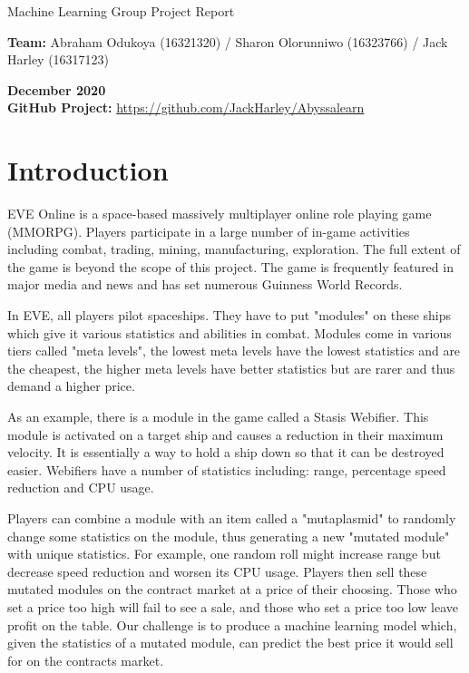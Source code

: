\documentclass[10pt]{article}
\begin{document}
\begin{singlespace}
	
	\begin{center}
		\begin{huge}
			Machine Learning Group Project Report
		\end{huge}
	\end{center}
	\bigskip
	
	\textbf{Team:} Abraham Odukoya (16321320) / Sharon Olorunniwo (16323766) / Jack Harley (16317123)
	
	\bigskip
	
	\textbf{December 2020}\\
	\textbf{GitHub Project:} \url{https://github.com/JackHarley/Abyssalearn}
\end{singlespace}

\setlength{\parskip}{0.7em}

\section{Introduction}
	EVE Online is a space-based massively multiplayer online role playing game (MMORPG). Players participate in a large number of in-game activities including combat, trading, mining, manufacturing, exploration. The full extent of the game is beyond the scope of this project. The game is frequently featured in major media and news and has set numerous Guinness World Records.
	
	In EVE, all players pilot spaceships. They have to put "modules" on these ships which give it various statistics and abilities in combat. Modules come in various tiers called "meta levels", the lowest meta levels have the lowest statistics and are the cheapest, the higher meta levels have better statistics but are rarer and thus demand a higher price.
	
	As an example, there is a module in the game called a Stasis Webifier. This module is activated on a target ship and causes a reduction in their maximum velocity. It is essentially a way to hold a ship down so that it can be destroyed easier. Webifiers have a number of statistics including: range, percentage speed reduction and CPU usage.
	
	Players can combine a module with an item called a "mutaplasmid" to randomly change some statistics on the module, thus generating a new "mutated module" with unique statistics. For example, one random roll might increase range but decrease speed reduction and worsen its CPU usage. Players then sell these mutated modules on the contract market at a price of their choosing. Those who set a price too high will fail to see a sale, and those who set a price too low leave profit on the table. Our challenge is to produce a machine learning model which, given the statistics of a mutated module, can predict the best price it would sell for on the contracts market.
	
\end{document}
